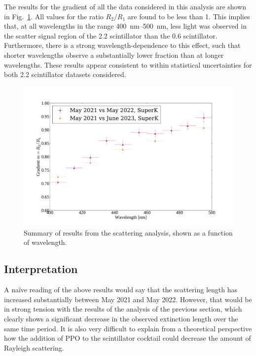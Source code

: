 The results for the gradient of all the data considered in this analysis are shown in Fig.~\ref{fig:smellie_scat_results_vs_wavelength}. All values for the ratio $R_{2}/R_{1}$ are found to be less than 1. This implies that, at all wavelengths in the range \SIrange{400}{500}{\nm}, less light was observed in the scatter signal region of the \SI{2.2}{\gpl} scintillator than the \SI{0.6}{\gpl} scintillator. Furthermore, there is a strong wavelength-dependence to this effect, such that shorter wavelengths observe a substantially lower fraction than at longer wavelengths. These results appear consistent to within statistical uncertainties for both \SI{2.2}{\gpl} scintillator datasets considered.

\begin{figure}
    \centering
    \includegraphics[width=\textwidth]{5_SMELLIEAnalysis/images/scattering_results_summary.pdf}
    \caption[Summary of results from the scattering analysis]
    {Summary of results from the scattering analysis, shown as a function of wavelength.}
    \label{fig:smellie_scat_results_vs_wavelength}
\end{figure}

\subsection{Interpretation}
A na\"{i}ve reading of the above results would say that the scattering length has increased substantially between May 2021 and May 2022. However, that would be in strong tension with the results of the analysis of the previous section, which clearly shows a significant decrease in the observed extinction length over the same time period. It is also very difficult to explain from a theoretical perspective how the addition of PPO to the scintillator cocktail could decrease the amount of Rayleigh scattering.


